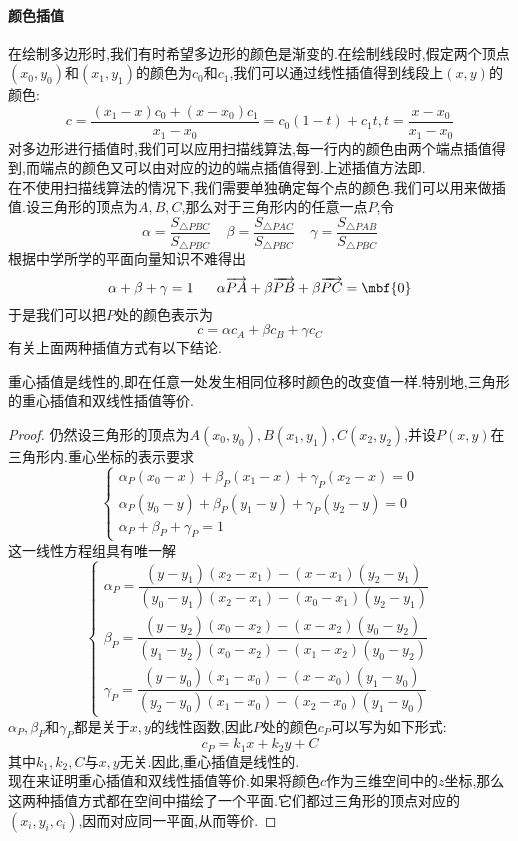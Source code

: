 \documentclass{ctexart}
\begin{document}
\paragraph{颜色插值}
在绘制多边形时,我们有时希望多边形的颜色是渐变的.在绘制线段时,假定两个顶点$\left(x_0,y_0\right)$和$\left(x_1,y_1\right)$的颜色为$c_0$和$c_1$,我们可以通过线性插值得到线段上$(x,y)$的颜色:
\[c=\dfrac{(x_1-x)c_0+(x-x_0)c_1}{x_1-x_0}=c_0(1-t)+c_1t,t=\dfrac{x-x_0}{x_1-x_0}\]
对多边形进行插值时,我们可以应用扫描线算法,每一行内的颜色由两个端点插值得到,而端点的颜色又可以由对应的边的端点插值得到.上述插值方法即.\\
\indent 在不使用扫描线算法的情况下,我们需要单独确定每个点的颜色.我们可以用来做插值.设三角形的顶点为$A,B,C$,那么对于三角形内的任意一点$P$,令
\[\alpha=\dfrac{S_{\triangle PBC}}{S_{\triangle PBC}}\ \ \ \ \ \beta=\dfrac{S_{\triangle PAC}}{S_{\triangle PBC}}\ \ \ \ \ \gamma=\dfrac{S_{\triangle PAB}}{S_{\triangle PBC}}\]
根据中学所学的平面向量知识不难得出
\[\alpha+\beta+\gamma=1\ \ \ \ \ \alpha\overrightarrow{PA}+\beta\overrightarrow{PB}+\beta\overrightarrow{PC}=\mbf{0}\]
于是我们可以把$P$处的颜色表示为
\[c=\alpha c_A+\beta c_B+\gamma c_C\]
有关上面两种插值方式有以下结论.
\begin{theorem}[重心插值和双线性插值的等价性]
    重心插值是线性的,即在任意一处发生相同位移时颜色的改变值一样.特别地,三角形的重心插值和双线性插值等价.
\end{theorem}
\begin{proof}
    仍然设三角形的顶点为$A\left(x_0,y_0\right),B\left(x_1,y_1\right),C\left(x_2,y_2\right)$,并设$P\left(x,y\right)$在三角形内.重心坐标的表示要求
    \[\left\{\begin{array}{l}
        \alpha_P(x_0-x)+\beta_P(x_1-x)+\gamma_P(x_2-x)=0\\
        \alpha_P(y_0-y)+\beta_P(y_1-y)+\gamma_P(y_2-y)=0\\
        \alpha_P+\beta_P+\gamma_P=1
    \end{array}\right.\]
    这一线性方程组具有唯一解
    \[\left\{\begin{array}{l}
        \alpha_P=\dfrac{\left(y-y_1\right)\left(x_2-x_1\right)-\left(x-x_1\right)\left(y_2-y_1\right)}{\left(y_0-y_1\right)\left(x_2-x_1\right)-\left(x_0-x_1\right)\left(y_2-y_1\right)}\\
        \beta_P=\dfrac{\left(y-y_2\right)\left(x_0-x_2\right)-\left(x-x_2\right)\left(y_0-y_2\right)}{\left(y_1-y_2\right)\left(x_0-x_2\right)-\left(x_1-x_2\right)\left(y_0-y_2\right)}\\
        \gamma_P=\dfrac{\left(y-y_0\right)\left(x_1-x_0\right)-\left(x-x_0\right)\left(y_1-y_0\right)}{\left(y_2-y_0\right)\left(x_1-x_0\right)-\left(x_2-x_0\right)\left(y_1-y_0\right)}
    \end{array}\right.\]
    $\alpha_P,\beta_P$和$\gamma_P$都是关于$x,y$的线性函数,因此$P$处的颜色$c_P$可以写为如下形式:
    \[c_P=k_1x+k_2y+C\]
    其中$k_1,k_2,C$与$x,y$无关.因此,重心插值是线性的.\\
    \indent 现在来证明重心插值和双线性插值等价.如果将颜色$c$作为三维空间中的$z$坐标,那么这两种插值方式都在空间中描绘了一个平面.它们都过三角形的顶点对应的$\left(x_i,y_i,c_i\right)$,因而对应同一平面,从而等价.
\end{proof}
\end{document}
